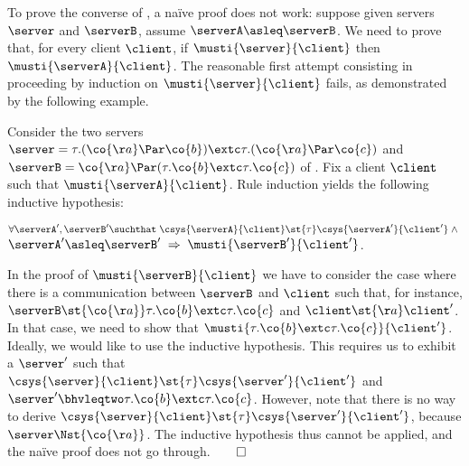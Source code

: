 \label{sec:bhv-soundness}\label{sec:soundness-bhv}

To prove the converse of , a naïve proof does not work:
suppose given servers $\server$ and $\serverB$, assume $\serverA \asleq \serverB$.
We need to prove that, for every client $\client$, if
$\musti{\server}{\client}$ then $\musti{\serverA}{\client}$.
The reasonable first attempt consisting in proceeding by induction on
$\musti{\server}{\client}$ fails, as demonstrated by the following example.

\begin{example}
  \label{ex:must-set-is-helpful}
  Consider the two servers $\server = \tau.(\co{\aa} \Par \co{b}) \extc
  \tau.(\co{\aa} \Par \co{c})$ and $\serverB = \co{\aa} \Par (\tau.\co{b} \extc
  \tau.\co{c})$ of .
  Fix a client $\client$ such that $\musti{\serverA}{\client}$.
  Rule induction %
  yields the following inductive hypothesis:
  \begin{center}
    $\forall \serverA', \serverB' \suchthat\;
    \csys{\serverA}{\client} \st{\tau} \csys{\serverA'}{\client'} \;\land\;$
    $\serverA' \asleq \serverB' \;\Rightarrow\; \musti{\serverB'}{\client'}$.
  \end{center}
  In the proof of
  $\musti{\serverB}{\client}$ we have to consider the case where there
  is a communication between $\serverB$ and
  $\client$ such that, for instance, $\serverB \st{\co{\aa}}
  \tau.\co{b} \extc \tau.\co{c}$ and $\client \st{\aa}
  \client'$.  In that case, we need to show that $ \musti{ \tau.\co{b}
    \extc \tau.\co{c}
  }{\client'}$. Ideally, we would like to use the inductive
  hypothesis. This requires us to exhibit a $\server'$ such that $
  \csys{\server}{\client} \st{\tau} \csys{\server'}{\client'}$ and $
  \server' \bhvleqtwo \tau.\co{b} \extc \tau.\co{c}$.
  However, note that there is no way to derive
  $\csys{\server}{\client} \st{\tau} \csys{\server'}{\client'}
  $, because $\server
  \Nst{\co{\aa}}$.  The inductive hypothesis thus cannot be applied,
  and the naïve proof does not go through.\hfill$\qed$
\end{example}
